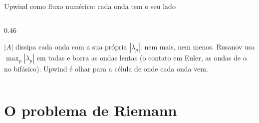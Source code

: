 \documentclass[aspectratio=169,10pt]{beamer}
\begin{document}
\begin{frame}{Upwind como fluxo numérico: cada onda tem o seu lado}
\begin{columns}[T]
\begin{column}{0.46\textwidth}
\begin{center}
\end{center}
\begin{intuicao}
$|A|$ dissipa cada onda com a sua própria $|\lambda_p|$: nem mais, nem menos. Rusanov usa $\max_p|\lambda_p|$ em todas e borra as ondas lentas (o contato em Euler, as ondas de $\alpha$ no bifásico). Upwind é olhar para a célula de onde cada onda vem.
\end{intuicao}
\end{column}
\end{columns}
\end{frame}


\section{O problema de Riemann}
\end{document}
